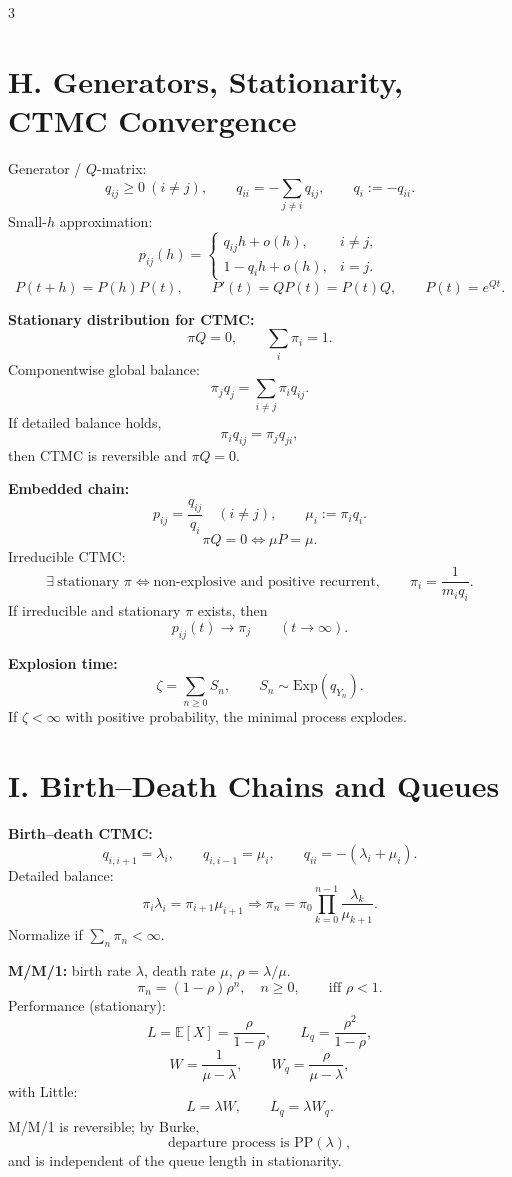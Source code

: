 \documentclass[8pt]{extarticle}
\newcommand{\E}{\mathbb{E}}
\newcommand{\1}{\mathbf{1}}
\begin{document}
\begin{multicols*}{3}
\section*{H. Generators, Stationarity, CTMC Convergence}
Generator / $Q$-matrix:
\[
q_{ij}\ge0\ (i\neq j),\qquad q_{ii}=-\sum_{j\neq i}q_{ij},\qquad q_i:=-q_{ii}.
\]
Small-$h$ approximation:
\[
p_{ij}(h)=
\begin{cases}
q_{ij}h+o(h),&i\neq j,\\
1-q_i h+o(h),&i=j.
\end{cases}
\]
\[
P(t+h)=P(h)P(t),\qquad P'(t)=QP(t)=P(t)Q,\qquad P(t)=e^{Qt}.
\]

\textbf{Stationary distribution for CTMC:}
\[
\pi Q=0,\qquad \sum_i\pi_i=1.
\]
Componentwise global balance:
\[
\pi_j q_j=\sum_{i\neq j}\pi_i q_{ij}.
\]
If detailed balance holds,
\[
\pi_i q_{ij}=\pi_j q_{ji},
\]
then CTMC is reversible and $\pi Q=0$.

\textbf{Embedded chain:}
\[
p_{ij}=\frac{q_{ij}}{q_i}\quad (i\neq j),\qquad
\mu_i:=\pi_i q_i.
\]
\[
\pi Q=0 \iff \mu P=\mu.
\]
Irreducible CTMC:
\[
\exists\ \text{stationary }\pi \iff \text{non-explosive and positive recurrent},
\qquad
\pi_i=\frac{1}{m_i q_i}.
\]
If irreducible and stationary $\pi$ exists, then
\[
p_{ij}(t)\to \pi_j\qquad (t\to\infty).
\]

\textbf{Explosion time:}
\[
\zeta=\sum_{n\ge0}S_n,\qquad S_n\sim \mathrm{Exp}(q_{Y_n}).
\]
If $\zeta<\infty$ with positive probability, the minimal process explodes.

\section*{I. Birth--Death Chains and Queues}
\textbf{Birth--death CTMC:}
\[
q_{i,i+1}=\lambda_i,\qquad q_{i,i-1}=\mu_i,\qquad q_{ii}=-(\lambda_i+\mu_i).
\]
Detailed balance:
\[
\pi_i\lambda_i=\pi_{i+1}\mu_{i+1}
\Rightarrow
\pi_n=\pi_0\prod_{k=0}^{n-1}\frac{\lambda_k}{\mu_{k+1}}.
\]
Normalize if $\sum_n\pi_n<\infty$.

\textbf{M/M/1:} birth rate $\lambda$, death rate $\mu$, $\rho=\lambda/\mu$.
\[
\pi_n=(1-\rho)\rho^n,\quad n\ge0,\qquad \text{iff }\rho<1.
\]
Performance (stationary):
\[
L=\E[X]=\frac{\rho}{1-\rho},\qquad
L_q=\frac{\rho^2}{1-\rho},
\]
\[
W=\frac{1}{\mu-\lambda},\qquad
W_q=\frac{\rho}{\mu-\lambda},
\]
with Little:
\[
L=\lambda W,\qquad L_q=\lambda W_q.
\]
M/M/1 is reversible; by Burke,
\[
\text{departure process is PP}(\lambda),
\]
and is independent of the queue length in stationarity.


\end{multicols*}
\end{document}

